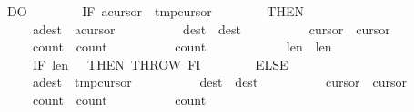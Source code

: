 \begin{isabellebody}
\ \ \ \ \ \ DO\isanewline
\ \ \ \ \ \ \ \ IF\ {\isasymacute}a{\isacharbang}{\isasymacute}cursor{}\ {\isacharless}\ {\isasymacute}tmp{\isacharbang}{\isasymacute}cursor{}\isanewline
\ \ \ \ \ \ \ \ THEN\isanewline
\ \ \ \ \ \ \ \ \ \ {\isasymacute}a{\isacharbang}{\isasymacute}dest\ {\isacharcolon}{\isacharequal}{\isacharequal}\ {\isasymacute}a{\isacharbang}{\isasymacute}cursor{}{\isacharsemicolon}{\isacharsemicolon}\isanewline
\ \ \ \ \ \ \ \ \ \ {\isasymacute}dest\ {\isacharcolon}{\isacharequal}{\isacharequal}\ {\isasymacute}dest{\isacharplus}{}{\isacharsemicolon}{\isacharsemicolon}\isanewline
\ \ \ \ \ \ \ \ \ \ {\isasymacute}cursor{}\ {\isacharcolon}{\isacharequal}{\isacharequal}\ {\isasymacute}cursor{}{\isacharplus}{}{\isacharsemicolon}{\isacharsemicolon}\isanewline
\ \ \ \ \ \ \ \ \ \ {\isasymacute}count{}\ {\isacharcolon}{\isacharequal}{\isacharequal}\ {\isasymacute}count{}{\isacharplus}{}{\isacharsemicolon}{\isacharsemicolon}\isanewline
\ \ \ \ \ \ \ \ \ \ {\isasymacute}count{}\ {\isacharcolon}{\isacharequal}{\isacharequal}\ {}{\isacharsemicolon}{\isacharsemicolon}\isanewline
\ \ \ \ \ \ \ \ \ \ {\isasymacute}len{}\ {\isacharcolon}{\isacharequal}{\isacharequal}\ {\isasymacute}len{}{\isacharminus}{}{\isacharsemicolon}{\isacharsemicolon}\isanewline
\ \ \ \ \ \ \ \ \ \ IF\ {\isasymacute}len{}\ {\isacharequal}\ {}\ THEN\ THROW\ FI\isanewline
\ \ \ \ \ \ \ \ ELSE\isanewline
\ \ \ \ \ \ \ \ \ \ {\isasymacute}a{\isacharbang}{\isasymacute}dest\ {\isacharcolon}{\isacharequal}{\isacharequal}\ {\isasymacute}tmp{\isacharbang}{\isasymacute}cursor{}{\isacharsemicolon}{\isacharsemicolon}\isanewline
\ \ \ \ \ \ \ \ \ \ {\isasymacute}dest\ {\isacharcolon}{\isacharequal}{\isacharequal}\ {\isasymacute}dest{\isacharplus}{}{\isacharsemicolon}{\isacharsemicolon}\isanewline
\ \ \ \ \ \ \ \ \ \ {\isasymacute}cursor{}\ {\isacharcolon}{\isacharequal}{\isacharequal}\ {\isasymacute}cursor{}{\isacharplus}{}{\isacharsemicolon}{\isacharsemicolon}\isanewline
\ \ \ \ \ \ \ \ \ \ {\isasymacute}count{}\ {\isacharcolon}{\isacharequal}{\isacharequal}\ {\isasymacute}count{}{\isacharplus}{}{\isacharsemicolon}{\isacharsemicolon}\isanewline
\ \ \ \ \ \ \ \ \ \ {\isasymacute}count{}\ {\isacharcolon}{\isacharequal}{\isacharequal}\ {}{\isacharsemicolon}{\isacharsemicolon}\isanewline

\end{isabellebody}
